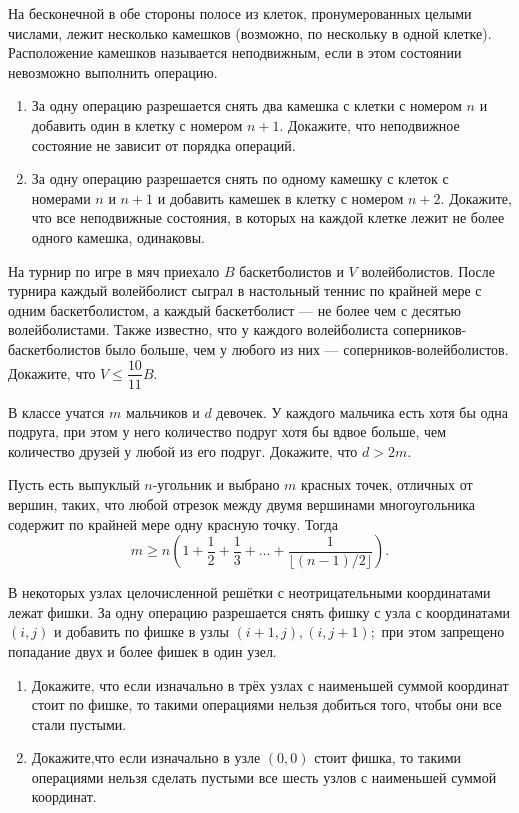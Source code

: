 \documentclass{article}
\begin{document}
\begin{enumerate_boxed}
        \item На бесконечной в обе стороны полосе из клеток, пронумерованных целыми числами, лежит несколько камешков (возможно, по нескольку в одной клетке).
        Расположение камешков называется неподвижным, если в этом состоянии невозможно выполнить операцию.
        \begin{enumerate}
            \item За одну операцию разрешается снять два камешка с клетки с номером $n$ и добавить один в клетку с номером $n + 1$.
            Докажите, что неподвижное состояние не зависит от порядка операций.

            \item За одну операцию разрешается снять по одному камешку с клеток с номерами $ n $ и $ n + 1 $ и добавить камешек в клетку с номером $ n + 2 $.
            Докажите, что все неподвижные состояния, в которых на каждой клетке лежит не более одного камешка, одинаковы.
        \end{enumerate}

        \item На турнир по игре в мяч приехало $ B $ баскетболистов и $ V $ волейболистов.
        После турнира каждый волейболист сыграл в настольный теннис по крайней мере с одним баскетболистом, а каждый баскетболист — не более чем с десятью волейболистами.
        Также известно, что у каждого волейболиста соперников-баскетболистов было больше, чем у любого из них — соперников-волейболистов.
        Докажите, что $ V \leqslant \dfrac{10}{11} B $.

        \item В классе учатся $ m $ мальчиков и $ d $ девочек.
        У каждого мальчика есть хотя бы одна подруга, при этом у него количество подруг хотя бы вдвое больше, чем количество друзей у любой из его подруг.
        Докажите, что $ d > 2m $.

        \item Пусть есть выпуклый $ n $-угольник и выбрано $ m $ красных точек, отличных от вершин, таких, что любой отрезок между двумя вершинами многоугольника содержит по крайней мере одну красную точку.
        Тогда
        \[ m\geqslant n \left(1+\dfrac{1}{2}+\dfrac{1}{3}+\dotsc+\dfrac{1}{\lfloor (n-1)/2\rfloor}\right). \]

        \item В некоторых узлах целочисленной решётки с неотрицательными координатами лежат фишки.
        За одну операцию разрешается снять фишку с узла с координатами $ (i, j) $ и добавить по фишке в узлы $ (i + 1, j), (i, j + 1); $ при этом запрещено попадание двух и более фишек в один узел.
        \begin{enumerate}
            \item Докажите, что если изначально в трёх узлах с наименьшей суммой координат стоит по фишке, то такими операциями нельзя добиться того, чтобы они все стали пустыми.
            \item Докажите,что если изначально в узле $ (0,0) $ стоит фишка, то такими операциями нельзя сделать пустыми все шесть узлов с наименьшей суммой координат.
        \end{enumerate}


\end{enumerate_boxed}
\end{document}
